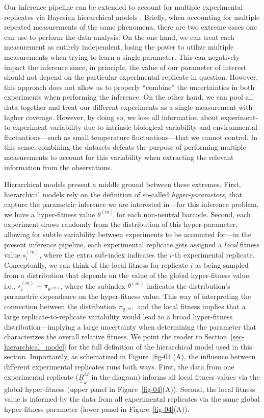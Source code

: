 \documentclass[
]{scrartcl}
\begin{document}
\begin{refsegment}
Our inference pipeline can be extended to account for multiple
experimental replicates via Bayesian hierarchical models
\autocite{betancourt2013}. Briefly, when accounting for multiple
repeated measurements of the same phenomena, there are two extreme cases
one can use to perform the data analysis: On the one hand, we can treat
each measurement as entirely independent, losing the power to utilize
multiple measurements when trying to learn a single parameter. This can
negatively impact the inference since, in principle, the value of our
parameter of interest should not depend on the particular experimental
replicate in question. However, this approach does not allow us to
properly ``combine'' the uncertainties in both experiments when
performing the inference. On the other hand, we can pool all data
together and treat our different experiments as a single measurement
with higher coverage. However, by doing so, we lose all information
about experiment-to-experiment variability due to intrinsic biological
variability and environmental fluctuations---such as small temperature
fluctuations---that we cannot control. In this sense, combining the
datasets defeats the purpose of performing multiple measurements to
account for this variability when extracting the relevant information
from the observations.

Hierarchical models present a middle ground between these extremes.
First, hierarchical models rely on the definition of so-called
\emph{hyper-parameters}, that capture the parametric inference we are
interested in---for this inference problem, we have a hyper-fitness
value \(\theta^{(m)}\) for each non-neutral barcode. Second, each
experiment draws randomly from the distribution of this hyper-parameter,
allowing for subtle variability between experiments to be accounted
for---in the present inference pipeline, each experimental replicate
gets assigned a \emph{local} fitness value \(s^{(m)}_i\), where the
extra sub-index indicates the \(i\)-th experimental replicate.
Conceptually, we can think of the local fitness for replicate \(i\) as
being sampled from a distribution that depends on the value of the
global hyper-fitness value, i.e., \(s^{(m)}_i \sim \pi_{\theta^{(m)}}\),
where the subindex \(\theta^{(m)}\) indicates the distribution's
parametric dependence on the hyper-fitness value. This way of
interpreting the connection between the distribution
\(\pi_{\theta^{(m)}}\) and the local fitness implies that a large
replicate-to-replicate variability would lead to a broad hyper-fitness
distribution---implying a large uncertainty when determining the
parameter that characterizes the overall relative fitness. We point the
reader to Section~\ref{sec-hierarchical_model} for the full definition
of the hierarchical model used in this section. Importantly, as
schematized in Figure~\ref{fig-04}(A), the influence between different
experimental replicates runs both ways. First, the data from one
experimental replicate (\(\underline{\underline{R}}^M_k\) in the
diagram) informs all local fitness values via the global hyper-fitness
(upper panel in Figure~\ref{fig-04}(A)). Second, the local fitness value
is informed by the data from all experimental replicates via the same
global hyper-fitness parameter (lower panel in Figure~\ref{fig-04}(A)).


\end{refsegment}
\end{document}
